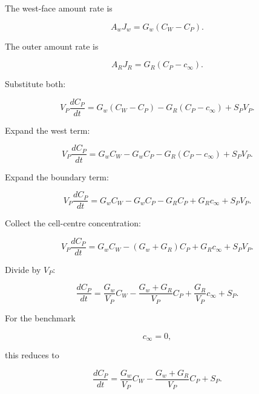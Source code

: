 \documentclass[11pt,a4paper]{article}
\begin{document}
The west-face amount rate is

\begin{equation}
A_wJ_w
=
G_w(C_W-C_P).
\tag{TRISO-FV-220}
\label{eq:triso-fv-220}
\end{equation}

The outer amount rate is

\begin{equation}
A_RJ_R
=
G_R(C_P-c_\infty).
\tag{TRISO-FV-221}
\label{eq:triso-fv-221}
\end{equation}

Substitute both:

\begin{equation}
V_P\frac{dC_P}{dt}
=
G_w(C_W-C_P)
-
G_R(C_P-c_\infty)
+
S_PV_P.
\tag{TRISO-FV-222}
\label{eq:triso-fv-222}
\end{equation}

Expand the west term:

\begin{equation}
V_P\frac{dC_P}{dt}
=
G_wC_W
-
G_wC_P
-
G_R(C_P-c_\infty)
+
S_PV_P.
\tag{TRISO-FV-223}
\label{eq:triso-fv-223}
\end{equation}

Expand the boundary term:

\begin{equation}
V_P\frac{dC_P}{dt}
=
G_wC_W
-
G_wC_P
-
G_RC_P
+
G_Rc_\infty
+
S_PV_P.
\tag{TRISO-FV-224}
\label{eq:triso-fv-224}
\end{equation}

Collect the cell-centre concentration:

\begin{equation}
\boxed{
V_P\frac{dC_P}{dt}
=
G_wC_W
-
(G_w+G_R)C_P
+
G_Rc_\infty
+
S_PV_P.
}
\tag{TRISO-FV-225}
\label{eq:triso-fv-225}
\end{equation}

Divide by $V_P$:

\begin{equation}
\boxed{
\frac{dC_P}{dt}
=
\frac{G_w}{V_P}C_W
-
\frac{G_w+G_R}{V_P}C_P
+
\frac{G_R}{V_P}c_\infty
+
S_P.
}
\tag{TRISO-FV-226}
\label{eq:triso-fv-226}
\end{equation}

For the benchmark

\begin{equation}
c_\infty=0,
\tag{TRISO-FV-227}
\label{eq:triso-fv-227}
\end{equation}

this reduces to

\begin{equation}
\boxed{
\frac{dC_P}{dt}
=
\frac{G_w}{V_P}C_W
-
\frac{G_w+G_R}{V_P}C_P
+
S_P.
}
\tag{TRISO-FV-228}
\label{eq:triso-fv-228}
\end{equation}
\end{document}
